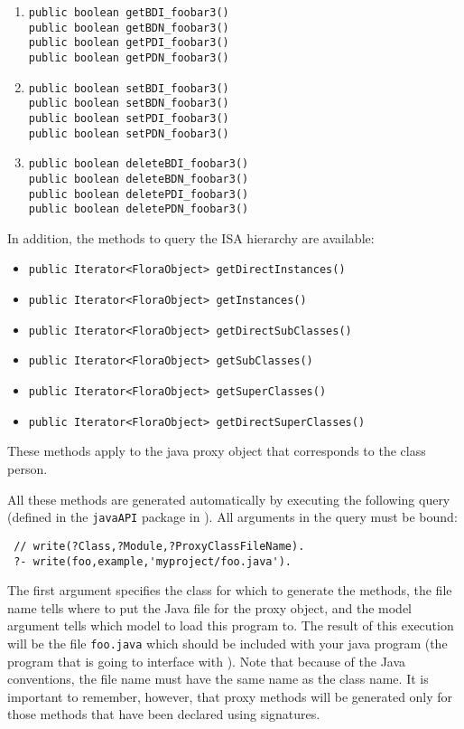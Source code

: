\begin{enumerate}
\item  {\tt public boolean getBDI\_foobar3()}   \\
  {\tt public boolean getBDN\_foobar3()} \\
  {\tt public boolean getPDI\_foobar3()}   \\
  {\tt public boolean getPDN\_foobar3()}
\item {\tt public boolean setBDI\_foobar3()}   \\
  {\tt public boolean setBDN\_foobar3()} \\
  {\tt public boolean setPDI\_foobar3()}   \\
  {\tt public boolean setPDN\_foobar3()}
\item {\tt public boolean deleteBDI\_foobar3()}  \\
  {\tt public boolean deleteBDN\_foobar3()}  \\
  {\tt public boolean deletePDI\_foobar3()}  \\
  {\tt public boolean deletePDN\_foobar3()}  
\end{enumerate}

In addition, the methods to query the ISA hierarchy are available:
\begin{itemize}
\item  {\tt public Iterator<FloraObject> getDirectInstances()}
\item  {\tt public Iterator<FloraObject> getInstances()}
\item  {\tt public Iterator<FloraObject> getDirectSubClasses()}
\item  {\tt public Iterator<FloraObject> getSubClasses()}
\item   {\tt public Iterator<FloraObject> getSuperClasses()}   
\item   {\tt public Iterator<FloraObject> getDirectSuperClasses()}   
\end{itemize}
These methods apply to the java proxy object that corresponds to the \fl
class person.

All these methods are generated automatically by executing the following
\FLSYSTEM query (defined in the \texttt{javaAPI} package in \FLSYSTEM).
All arguments in the query must be bound:
\begin{verbatim}
 // write(?Class,?Module,?ProxyClassFileName).
 ?- write(foo,example,'myproject/foo.java').
\end{verbatim}
The first argument specifies the class for which to generate the methods,
the file name tells where to put the Java file for the proxy object,
and the model argument tells which \FLSYSTEM model to load this program to. The
result of this execution will be the file {\tt foo.java} which should be
included with your java program (the program that is going to interface with
\FLSYSTEM). Note that because of the Java conventions, the file name must have
the same name as the class name.
It is important to remember, however, that proxy methods will
be generated only for those \fl methods that have been declared using
signatures.

